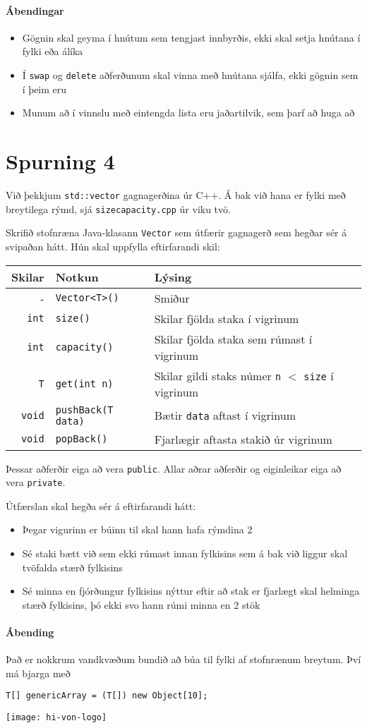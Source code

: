 \documentclass{article}
\begin{document}
\paragraph{Ábendingar} 

\begin{itemize}
 \item Gögnin skal geyma í hnútum sem tengjast innbyrðis, ekki skal setja hnútana í fylki eða álíka
 \item Í \texttt{swap} og \texttt{delete} aðferðunum skal vinna með hnútana sjálfa, ekki gögnin sem í þeim eru
 \item Munum að í vinnslu með eintengda lista eru jaðartilvik, sem þarf að huga að
\end{itemize}

\section{Spurning 4}
Við þekkjum \texttt{std::vector} gagnagerðina úr C++. Á bak við hana er fylki með breytilega rýmd, sjá \texttt{sizecapacity.cpp} úr viku tvö.

Skrifið stofnræna Java-klasann \texttt{Vector} sem útfærir gagnagerð sem hegðar sér á svipaðan hátt. Hún skal uppfylla eftirfarandi skil:

\begin{center}
\begin{tabular}{rll}
\toprule
Skilar&Notkun&Lýsing\\
\midrule
-&\texttt{Vector<T>()}& Smiður\\
\texttt{int}&\texttt{size()}&Skilar fjölda staka í vigrinum\\
\texttt{int}&\texttt{capacity()}&Skilar fjölda staka sem rúmast í vigrinum\\
\texttt{T}&\texttt{get(int n)}&Skilar gildi staks númer \texttt{n} $<$ \texttt{size} í vigrinum\\
\texttt{void}&\texttt{pushBack(T data)}&Bætir \texttt{data} aftast í vigrinum\\
\texttt{void}&\texttt{popBack()}&Fjarlægir aftasta stakið úr vigrinum\\
\bottomrule
\end{tabular}
\end{center}
Þessar aðferðir eiga að vera \texttt{public}. Allar aðrar aðferðir og eiginleikar eiga að vera \texttt{private}.

Útfærslan skal hegða sér á eftirfarandi hátt: 
\begin{itemize}
 \item Þegar vigurinn er búinn til skal hann hafa rýmdina 2
 \item Sé staki bætt við sem ekki rúmast innan fylkisins sem á bak við liggur skal tvöfalda stærð fylkisins
 \item Sé minna en fjórðungur fylkisins nýttur eftir að stak er fjarlægt skal helminga stærð fylkisins, þó ekki svo hann rúmi minna en 2 stök
\end{itemize}

\paragraph{Ábending} Það er nokkrum vandkvæðum bundið að búa til fylki af stofnrænum breytum. Því má bjarga með 
\begin{center}
\texttt{T[] genericArray = (T[]) new Object[10];}
\end{center}

\vfill
\texttt{[image: hi-von-logo]}
\end{document}
